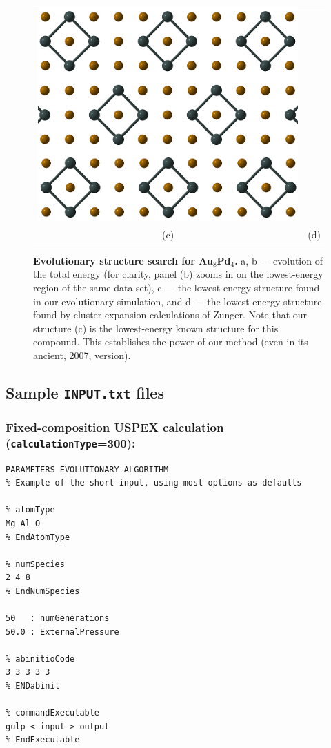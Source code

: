 \documentclass[12pt]{article}
\newcommand{\keyword}[1]{\texttt{#1}}
\newcommand{\file}[1]{\texttt{#1}}
\begin{document}
\begin{figure}[htbp]
\begin{tabular}{c c}
		\includegraphics[scale=0.35]{pic/testrun_d} \\
		(c) & (d)
	\end{tabular}
\caption[]{\footnotesize
\textbf{Evolutionary structure search for Au$_8$Pd$_4$.} a, b --- evolution of
the total energy (for clarity, panel (b) zooms in on the lowest-energy region of
the same data set), c --- the lowest-energy structure found in our evolutionary
simulation, and d --- the lowest-energy structure found by cluster expansion
calculations of Zunger. Note that our structure (c) is the lowest-energy known
structure for this compound. This establishes the power of our method (even in
its ancient, 2007, version).}
\end{figure}

\newpage
\subsection{Sample \file{INPUT.txt} files} \label{appendix_input_files}

\subsubsection{Fixed-composition USPEX calculation
(\keyword{calculationType}=300):}

\lstset{language=MATLAB, frame=single, basicstyle=\small}
\begin{lstlisting}
PARAMETERS EVOLUTIONARY ALGORITHM
% Example of the short input, using most options as defaults

% atomType
Mg Al O
% EndAtomType

% numSpecies
2 4 8
% EndNumSpecies

50   : numGenerations 
50.0 : ExternalPressure

% abinitioCode 
3 3 3 3 3
% ENDabinit

% commandExecutable
gulp < input > output
% EndExecutable
\end{lstlisting}
\end{document}
